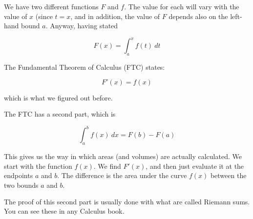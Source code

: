 \documentclass[11pt, oneside]{article}   	%
\begin{document}
We have two different functions $F$ and $f$.  The value for each will vary with the value of $x$ (since $t=x$, and in addition, the value of $F$ depends also on the left-hand bound $a$.  Anyway, having stated

\[ F(x) = \int_a^x f(t) \ dt \]

The Fundamental Theorem of Calculus (FTC) states:

\[ F'(x) = f(x) \]

which is what we figured out before.

The FTC has a second part, which is

\[ \int_a^b f(x) \ dx = F(b) - F(a) \]

This gives us the way in which areas (and volumes) are actually calculated.  We start with the function $f(x)$.  We find $F'(x)$, and then just evaluate it at the endpoints $a$ and $b$.  The difference is the area under the curve $f(x)$ between the two bounds $a$ and $b$.

The proof of this second part is usually done with what are called Riemann sums.  You can see these in any Calculus book.
\end{document}
